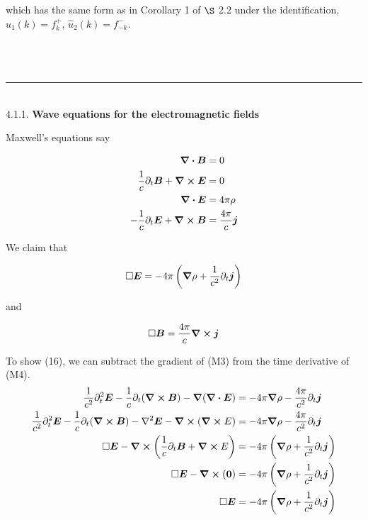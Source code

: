 \documentclass[]{article}
\begin{document}
which has the same form as in Corollary 1 of $\S$ 2.2 under the identification, $\hat{u}_1(k) = f^+_{k} $, $\hat{u}_2(k)  =  f^-_{-k}  $. \\

\hfill \\
\hfill \\
\hfill \\
\noindent\rule{15cm}{0.4pt} \\
4.1.1. {\bf Wave equations for the electromagnetic fields}

Maxwell's equations say

\begin{equation}
\begin{split}
\div \bm{B} & = 0   \\
\frac{1}{c} \partial_t \bm{B} + \curl\bm{E}  &= 0 \\
\div \bm{E}  &= 4\pi\rho \\
-\frac{1}{c} \partial_t \bm{E} + \curl \bm{B}  &= \frac{4\pi}{c} \bm{j} \\
\end{split}
\end{equation}

We claim that 

\begin{equation}
\begin{split}
\square\bm{E} = -4\pi\left( \grad\rho + \frac{1}{c^2}\partial_t \bm{j} \right) \\
\end{split}
\end{equation}

and

\begin{equation}
\begin{split}
\square\bm{B} =  \frac{4\pi}{c}\curl \bm{j} \\
\end{split}
\end{equation}

To show (16), we can subtract the gradient of (M3) from the time derivative of (M4). \\

\begin{equation}
\begin{split}
\frac{1}{c^2}\partial^2_t \bm{E} - \frac{1}{c}\partial_t(\curl\bm{B})  - \grad(\div\bm{E}) & =  - 4\pi\grad\rho - \frac{4\pi}{ c^2} \partial_t \bm{j} \\
\frac{1}{c^2}\partial^2_t \bm{E} - \frac{1}{c}\partial_t(\curl\bm{B})  -  \laplacian\bm{E} - \curl(\curl{E})  & =  - 4\pi\grad\rho - \frac{4\pi}{ c^2} \partial_t \bm{j} \\
\square\bm{E} - \curl\left(  \frac{1}{c}\partial_t\bm{B} + \curl{E}  \right) & = -4\pi\left( \grad\rho + \frac{1}{c^2}\partial_t \bm{j} \right) \\
\square\bm{E} - \curl\left( \bm{0}  \right) & = -4\pi\left( \grad\rho + \frac{1}{c^2}\partial_t \bm{j} \right) \\
\square\bm{E} & = -4\pi\left( \grad\rho + \frac{1}{c^2}\partial_t \bm{j} \right) \\
\end{split}
\end{equation}
\end{document}
